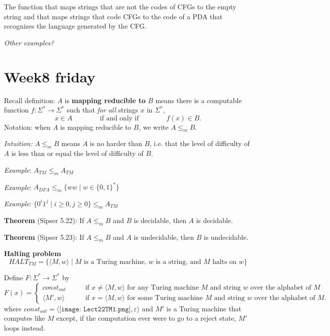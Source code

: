 \documentclass[12pt, oneside]{article}
\begin{document}
\newpage


The function that maps strings that are not the codes of CFGs to the empty 
string and that maps strings that code CFGs to the code of a PDA that recognizes
the language generated by the CFG.


\vfill

{\it Other examples?}
 \vfill
\section*{Week8 friday}



Recall definition:  $A$ is  {\bf  mapping  reducible to} $B$  means there is a computable function 
$f : \Sigma^* \to \Sigma^*$ such that {\it for all} strings  $x$ in $\Sigma^*$, 
\[
x  \in  A \qquad \qquad \text{if and  only  if} \qquad \qquad f(x) \in B.
\]
Notation:  when $A$  is mapping reducible to $B$, we write $A  \leq_m B$.

{\it Intuition:} $A \leq_m B$ means $A$ is no harder than $B$, i.e. that the level 
of difficulty of $A$ is less than or equal the level of difficulty of $B$.


{\it Example}: $A_{TM} \leq_m A_{TM}$ 

\vfill

{\it Example}: $A_{DFA} \leq_m \{ ww \mid  w \in \{0,1\}^* \}$ 

\vfill



{\it Example}: $\{ 0^i  1^j \mid i  \geq 0, j \geq 0 \} \leq_m A_{TM}$ 

\vfill

{\bf Theorem} (Sipser 5.22): If $A \leq_m B$ and $B$ is decidable, then $A$ is decidable.
    

{\bf Theorem} (Sipser 5.23): If $A \leq_m B$ and $A$ is undecidable, then $B$ is undecidable.
    

\newpage

    {\bf Halting problem}
    \[
    HALT_{TM} = \{ \langle M, w \rangle \mid \text{$M$ is a  Turing machine, $w$ is  a string, and $M$ halts on $w$} \}
    \]
    
    Define $F: \Sigma^* \to \Sigma^*$ by
    \[
    F(x) =  \begin{cases}
    const_{out} \qquad &\text{if  $x \neq \langle M,w \rangle$ for any Turing machine  $M$ and string  $w$ over the alphabet of $M$} \\
    \langle M', w \rangle \qquad &  \text{if $x = \langle M, w \rangle$ for some Turing machine  $M$ and string $w$ over the alphabet of $M$.}
    \end{cases}
    \]
    where $const_{out}  =  \langle  \texttt{[image: Lect22TM1.png]} ,  \varepsilon  \rangle$
    and  $M'$ is a Turing machine that computes like $M$ except, if the computation ever were to go to a  reject state,
    $M'$ loops instead.
    
\end{document}
